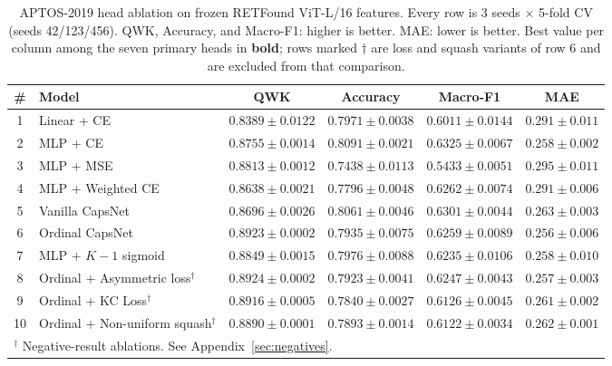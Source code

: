 \documentclass[journal]{IEEEtran}
\begin{document}
\begin{table}[!t]
    \caption{APTOS-2019 head ablation on frozen RETFound ViT-L/16 features. Every row is 3 seeds $\times$ 5-fold CV (seeds 42/123/456). QWK, Accuracy, and Macro-F1: higher is better. MAE: lower is better. Best value per column among the seven primary heads in \textbf{bold}; rows marked $\dag$ are loss and squash variants of row 6 and are excluded from that comparison.}
    \label{tab:aptos}
    \centering
    \footnotesize
    \begin{tabular}{@{}clcccc@{}}
        \toprule
        \# & Model                                       & QWK                          & Accuracy                     & Macro-F1                     & MAE                        \\
        \midrule
        1  & Linear + CE                                 & $0.8389 \pm 0.0122$           & $0.7971 \pm 0.0038$           & $0.6011 \pm 0.0144$           & $0.291 \pm 0.011$ \\
        2  & MLP + CE                                    & $0.8755 \pm 0.0014$           & $\mathbf{0.8091 \pm 0.0021}$ & $\mathbf{0.6325 \pm 0.0067}$ & $0.258 \pm 0.002$ \\
        3  & MLP + MSE                                   & $0.8813 \pm 0.0012$           & $0.7438 \pm 0.0113$           & $0.5433 \pm 0.0051$           & $0.295 \pm 0.011$ \\
        4  & MLP + Weighted CE                           & $0.8638 \pm 0.0021$           & $0.7796 \pm 0.0048$           & $0.6262 \pm 0.0074$           & $0.291 \pm 0.006$ \\
        5  & Vanilla CapsNet                             & $0.8696 \pm 0.0026$           & $0.8061 \pm 0.0046$           & $0.6301 \pm 0.0044$           & $0.263 \pm 0.003$ \\
        6  & Ordinal CapsNet                             & $\mathbf{0.8923 \pm 0.0002}$ & $0.7935 \pm 0.0075$           & $0.6259 \pm 0.0089$           & $\mathbf{0.256 \pm 0.006}$ \\
        7  & MLP + $K{-}1$ sigmoid                       & $0.8849 \pm 0.0015$           & $0.7976 \pm 0.0088$           & $0.6235 \pm 0.0106$           & $0.258 \pm 0.010$ \\
        8  & \quad Ordinal + Asymmetric loss$^{\dag}$    & $0.8924 \pm 0.0002$  & $0.7923 \pm 0.0041$           & $0.6247 \pm 0.0043$           & $0.257 \pm 0.003$ \\
        9  & \quad Ordinal + KC Loss$^{\dag}$            & $0.8916 \pm 0.0005$           & $0.7840 \pm 0.0027$           & $0.6126 \pm 0.0045$           & $0.261 \pm 0.002$ \\
        10 & \quad Ordinal + Non-uniform squash$^{\dag}$ & $0.8890 \pm 0.0001$           & $0.7893 \pm 0.0014$           & $0.6122 \pm 0.0034$           & $0.262 \pm 0.001$ \\
        \bottomrule
        \multicolumn{6}{l}{\scriptsize $^{\dag}$ Negative-result ablations. See Appendix~\ref{sec:negatives}.}
    \end{tabular}
\end{table}
\end{document}
